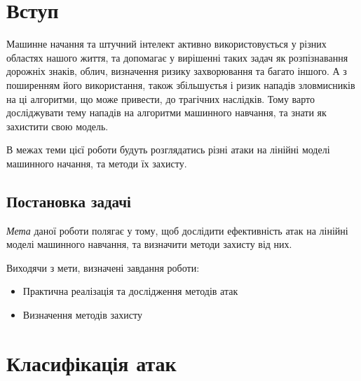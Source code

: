 \documentclass[a4paper,14pt]{extreport}
\begin{document}
	
	\tableofcontents
	\newpage
	
	
	\chapter{Вступ} 
	Машинне начання та штучний інтелект активно використовується у різних областях нашого життя, та допомагає у вирішенні таких задач як розпізнавання дорожніх знаків, облич, визначення ризику захворювання та багато іншого.
	А з поширенням його використання, також збільшуєтья і ризик нападів зловмисників на ці алгоритми, що може привести, до трагічних наслідків. Тому варто досліджувати тему нападів на алгоритми машинного навчання, та знати як захистити свою модель. \par
	В межах теми цієї роботи будуть розглядатись різні атаки на лінійні моделі машинного начання, та методи їх захисту.
	
	
	\section{Постановка задачі} 
	\textit{Мета} даної роботи полягає у тому, щоб дослідити ефективність атак на лінійні моделі машинного навчання, та визначити методи захисту від них. \par
	Виходячи з мети, визначені завдання роботи:
	\begin{itemize}  
	\item Практична реалізація та дослідження методів атак
	\item Визначення методів захисту
	\end{itemize}
	
	
	\chapter{Класифікація атак} 
	
\end{document}
